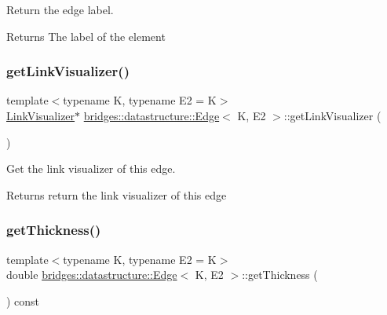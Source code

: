 Return the edge label. 

\begin{DoxyReturn}{Returns}
The label of the element 
\end{DoxyReturn}
\mbox{\label{classbridges_1_1datastructure_1_1_edge_a0470604705c93dd33b382a70d5c78f93}} 
\subsubsection{\texorpdfstring{get\+Link\+Visualizer()}{getLinkVisualizer()}}
{\footnotesize\ttfamily template$<$typename K, typename E2 = K$>$ \\
\hyperlink{classbridges_1_1datastructure_1_1_link_visualizer}{Link\+Visualizer}$\ast$ \hyperlink{classbridges_1_1datastructure_1_1_edge}{bridges\+::datastructure\+::\+Edge}$<$ K, E2 $>$\+::get\+Link\+Visualizer (\begin{DoxyParamCaption}{ }\end{DoxyParamCaption})\hspace{0.3cm}{\ttfamily [inline]}}



Get the link visualizer of this edge. 

\begin{DoxyReturn}{Returns}
return the link visualizer of this edge 
\end{DoxyReturn}
\mbox{\label{classbridges_1_1datastructure_1_1_edge_a6163e53061d4785b969fa664dbae104b}} 
\subsubsection{\texorpdfstring{get\+Thickness()}{getThickness()}}
{\footnotesize\ttfamily template$<$typename K, typename E2 = K$>$ \\
double \hyperlink{classbridges_1_1datastructure_1_1_edge}{bridges\+::datastructure\+::\+Edge}$<$ K, E2 $>$\+::get\+Thickness (\begin{DoxyParamCaption}{ }\end{DoxyParamCaption}) const\hspace{0.3cm}{\ttfamily [inline]}}



